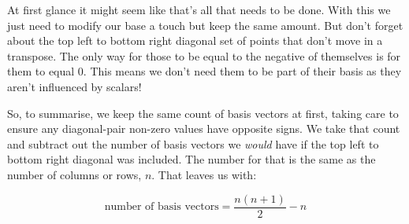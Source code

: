 At first glance it might seem like that's all that needs to be done. With this we just need to modify our base a touch but keep the same amount. But don't forget about the top left to bottom right diagonal set of points that don't move in a transpose. The only way for those to be equal to the negative of themselves is for them to equal 0. This means we don't need them to be part of their basis as they aren't influenced by scalars! 

So, to summarise, we keep the same count of basis vectors at first, taking care to ensure any diagonal-pair non-zero values have opposite signs. We take that count and subtract out the number of basis vectors we \emph{would} have if the top left to bottom right diagonal was included. The number for that is the same as the number of columns or rows, $n$. That leaves us with:

\[\text{number of basis vectors} = \frac{n(n+1)}{2} - n\]
